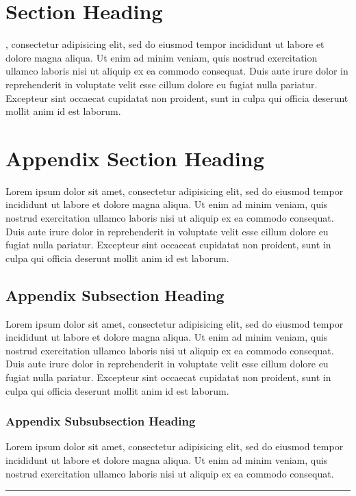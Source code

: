 \documentclass[11pt]{salam}
\begin{document}
\section{Section Heading}
, consectetur adipisicing elit, sed do eiusmod tempor incididunt ut labore et dolore magna aliqua. Ut enim ad minim veniam, quis nostrud exercitation ullamco laboris nisi ut aliquip ex ea commodo consequat. Duis aute irure dolor in reprehenderit in voluptate velit esse cillum dolore eu fugiat nulla pariatur. Excepteur sint occaecat cupidatat non proident, sunt in culpa qui officia deserunt mollit anim id est laborum.


\appendix


\section{Appendix Section Heading}
Lorem ipsum dolor sit amet, consectetur adipisicing elit, sed do eiusmod tempor incididunt ut labore et dolore magna aliqua. Ut enim ad minim veniam, quis nostrud exercitation ullamco laboris nisi ut aliquip ex ea commodo consequat. Duis aute irure dolor in reprehenderit in voluptate velit esse cillum dolore eu fugiat nulla pariatur. Excepteur sint occaecat cupidatat non proident, sunt in culpa qui officia deserunt mollit anim id est laborum.

\subsection{Appendix Subsection Heading}
Lorem ipsum dolor sit amet, consectetur adipisicing elit, sed do eiusmod tempor incididunt ut labore et dolore magna aliqua. Ut enim ad minim veniam, quis nostrud exercitation ullamco laboris nisi ut aliquip ex ea commodo consequat. Duis aute irure dolor in reprehenderit in voluptate velit esse cillum dolore eu fugiat nulla pariatur. Excepteur sint occaecat cupidatat non proident, sunt in culpa qui officia deserunt mollit anim id est laborum.

  \subsubsection{Appendix Subsubsection Heading}
  Lorem ipsum dolor sit amet, consectetur adipisicing elit, sed do eiusmod tempor incididunt ut labore et dolore magna aliqua. Ut enim ad minim veniam, quis nostrud exercitation ullamco laboris nisi ut aliquip ex ea commodo consequat.

\begin{center}
  \vspace*{0.5em}
  \rule{0.8\textwidth}{0.8pt}
\end{center}

\nocite{*}
{\small }
\end{document}
